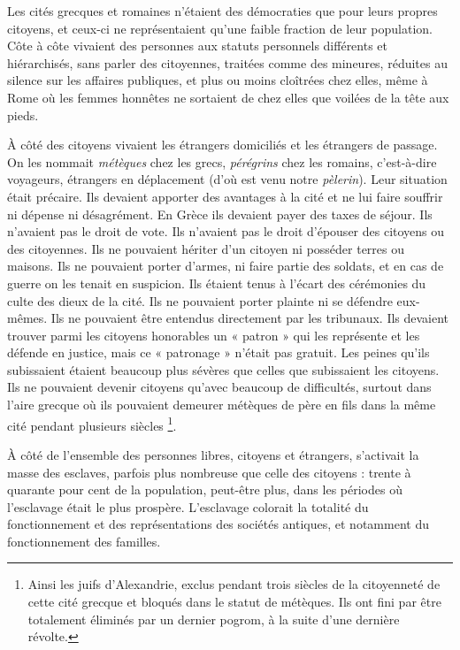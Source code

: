 Les cités grecques et romaines n'étaient des démocraties que pour
leurs propres citoyens, et ceux-ci ne représentaient qu'une faible fraction de leur
population. Côte à côte vivaient des personnes aux statuts personnels
différents et hiérarchisés, sans parler des citoyennes, traitées comme des
mineures, réduites au silence sur les affaires publiques, et plus ou moins
cloîtrées chez elles, même à Rome où les femmes honnêtes ne sortaient
de chez elles que voilées de la tête aux pieds.

À côté des citoyens vivaient les étrangers domiciliés et les étrangers
de passage. On les nommait \emph{métèques} chez les grecs, \emph{pérégrins} chez les
romains, c'est-à-dire voyageurs, étrangers en déplacement (d'où est venu
notre \emph{pèlerin}). Leur situation était précaire. Ils devaient apporter des avantages
à la cité et ne lui faire souffrir ni dépense ni désagrément. En Grèce
ils devaient payer des taxes de séjour. Ils n'avaient pas le droit de vote. Ils
n'avaient pas le droit d'épouser des citoyens ou des citoyennes. Ils ne
pouvaient hériter d'un citoyen ni posséder terres ou maisons. Ils ne pouvaient
porter d'armes, ni faire partie des soldats, et en cas de guerre on
les tenait en suspicion. Ils étaient tenus à l'écart des cérémonies du culte
des dieux de la cité. Ils ne pouvaient porter plainte ni se défendre eux-mêmes.
Ils ne pouvaient être entendus directement par les tribunaux. Ils
devaient trouver parmi les citoyens honorables un « patron » qui les représente
et les défende en justice, mais ce « patronage » n'était pas gratuit.
Les peines qu'ils subissaient étaient beaucoup plus sévères que celles
que subissaient les citoyens. Ils ne pouvaient devenir citoyens qu'avec
beaucoup de difficultés, surtout dans l'aire grecque où ils pouvaient demeurer
métèques de père en fils dans la même cité pendant plusieurs siècles%
\footnote{Ainsi
les juifs d'Alexandrie, exclus pendant trois siècles de la citoyenneté de cette cité grecque et bloqués dans le statut de métèques. Ils ont fini par être totalement éliminés par un dernier pogrom, à la suite d'une dernière révolte.}.

À côté de l'ensemble des personnes libres, citoyens et étrangers,
s'activait la masse des esclaves, parfois plus nombreuse que celle des citoyens :
 trente à quarante pour cent de la population, peut-être plus, dans
les périodes où l'esclavage était le plus prospère. L'esclavage colorait la
totalité du fonctionnement et des représentations des sociétés antiques,
et notamment du fonctionnement des familles.

